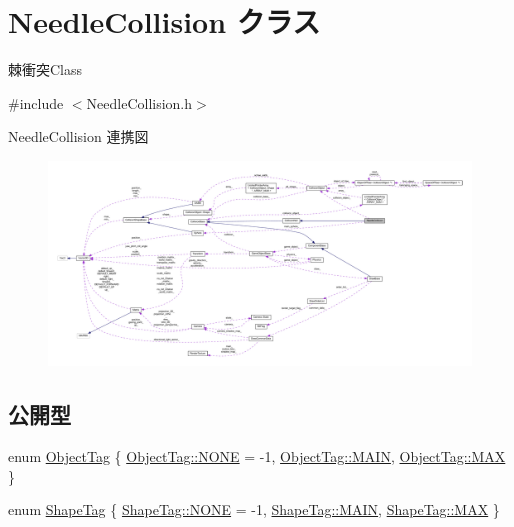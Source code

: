 \hypertarget{class_needle_collision}{}\section{Needle\+Collision クラス}
\label{class_needle_collision}


棘衝突\+Class  




{\ttfamily \#include $<$Needle\+Collision.\+h$>$}



Needle\+Collision 連携図\nopagebreak
\begin{figure}[H]
\begin{center}
\leavevmode
\includegraphics[width=350pt]{class_needle_collision__coll__graph}
\end{center}
\end{figure}
\subsection*{公開型}
\begin{DoxyCompactItemize}
\item 
enum \mbox{\hyperlink{class_needle_collision_a6c4a6b084cf70c08c03c66ddfdf1d2ed}{Object\+Tag}} \{ \mbox{\hyperlink{class_needle_collision_a6c4a6b084cf70c08c03c66ddfdf1d2edab50339a10e1de285ac99d4c3990b8693}{Object\+Tag\+::\+N\+O\+NE}} = -\/1, 
\mbox{\hyperlink{class_needle_collision_a6c4a6b084cf70c08c03c66ddfdf1d2eda186495f7da296bf880df3a22a492b378}{Object\+Tag\+::\+M\+A\+IN}}, 
\mbox{\hyperlink{class_needle_collision_a6c4a6b084cf70c08c03c66ddfdf1d2eda26a4b44a837bf97b972628509912b4a5}{Object\+Tag\+::\+M\+AX}}
 \}
\item 
enum \mbox{\hyperlink{class_needle_collision_a7584717bbbf735d73ea6415ca8a0b841}{Shape\+Tag}} \{ \mbox{\hyperlink{class_needle_collision_a7584717bbbf735d73ea6415ca8a0b841ab50339a10e1de285ac99d4c3990b8693}{Shape\+Tag\+::\+N\+O\+NE}} = -\/1, 
\mbox{\hyperlink{class_needle_collision_a7584717bbbf735d73ea6415ca8a0b841a186495f7da296bf880df3a22a492b378}{Shape\+Tag\+::\+M\+A\+IN}}, 
\mbox{\hyperlink{class_needle_collision_a7584717bbbf735d73ea6415ca8a0b841a26a4b44a837bf97b972628509912b4a5}{Shape\+Tag\+::\+M\+AX}}
 \}
\end{DoxyCompactItemize}
